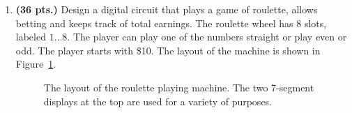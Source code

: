 \begin{enumerate}
\item {\bf (36 pts.)}
Design a digital circuit that plays a game of
roulette, allows betting and keeps track of total earnings.
The roulette wheel has 8 slots, labeled $1 \ldots 8$.  The player
can play one of the numbers straight or play even or odd.
The player starts with \$10. 
The layout of the machine is shown in Figure~\ref{fig:Roulette}.
\begin{figure}[ht]
\caption{The layout of the roulette playing machine.  
The two 7-segment displays at the top are used for a variety
of purposes.}
\label{fig:Roulette}
\end{figure}


\end{enumerate}
